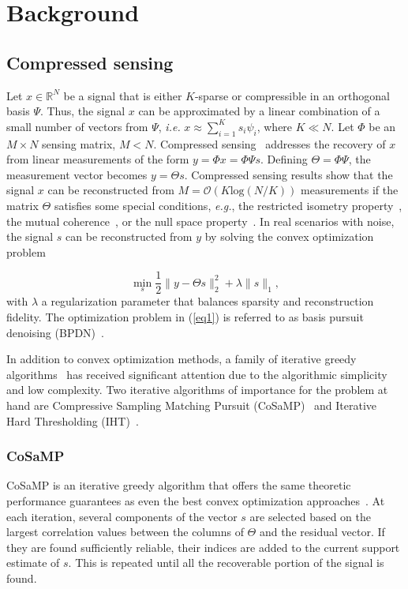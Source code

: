\documentclass[journal]{IEEEtran}
\begin{document}
\section{Background}
\subsection{Compressed sensing}
Let $x\in\mathbb{R}^N$ be a signal that is either
$K$-sparse or compressible in an orthogonal basis $\Psi$. Thus, the signal $x$ can be approximated by a linear combination of a small number of vectors from $\Psi$, \textit{i.e.} $x\approx\sum_{i=1}^{K} s_i\psi_i$, where $K\ll N$. Let $\Phi$ be an $M\times N$ sensing matrix, $M<N$. Compressed sensing~\cite{Dono06, Cand08} addresses the recovery of $x$ from linear measurements of the form $y=\Phi x=\Phi\Psi s$. Defining $\Theta=\Phi\Psi$, the measurement vector becomes $y=\Theta s$. Compressed sensing results show that the signal $x$ can be reconstructed from $M=\mathcal{O}(K \text{log}(N/K))$ measurements if the matrix $\Theta$ satisfies some special conditions, \textit{e.g.}, the restricted isometry property~\cite{Cand08}, the mutual coherence~\cite{Bruc09}, or the null space property~\cite{Dono06}. In real scenarios with noise, the signal $s$ can be reconstructed from $y$ by solving the convex optimization problem

\begin{equation}\label{eq1}
\min_{s} \frac{1}{2}\|y-\Theta s\|_{2}^{2}+\lambda \|s\|_{1},
\end{equation}
with  $\lambda$ a regularization parameter that balances sparsity and reconstruction fidelity. The optimization problem in (\ref{eq1}) is referred to as basis pursuit denoising (BPDN)~\cite{Chen98}.

In addition to  convex optimization methods, a family of iterative greedy algorithms~\cite{Trop07,Need08,Need09} has received significant attention due to the algorithmic simplicity and low complexity. Two iterative algorithms of importance for the problem at hand are Compressive Sampling Matching Pursuit (CoSaMP)~\cite{Need08} and Iterative Hard Thresholding (IHT)~\cite{Blum09}.

\subsubsection{CoSaMP}
 CoSaMP is an iterative greedy algorithm that offers the same theoretic performance guarantees as even the best convex optimization approaches~\cite{Need08}. At each iteration, several components of the vector $s$ are selected based on the largest correlation values between the columns of $\Theta$ and the residual vector. If they are found sufficiently reliable, their indices are added to the current support estimate of $s$. This is repeated until all the recoverable portion of the signal is found.
\end{document}
